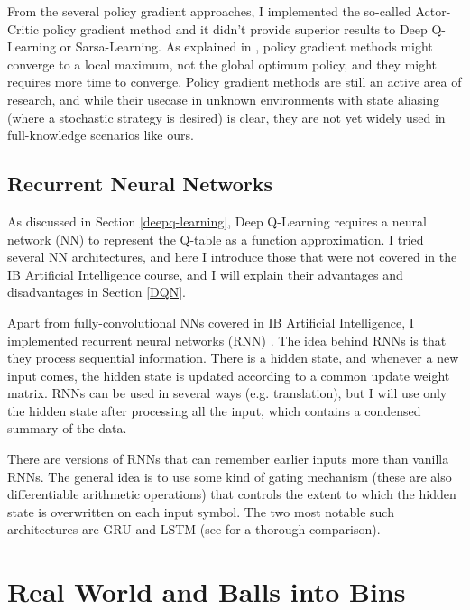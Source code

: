 From the several policy gradient approaches, I implemented the so-called Actor-Critic policy gradient method and it didn't provide superior results to Deep Q-Learning or Sarsa-Learning. As explained in \cite{bhandari2019policygradientconvergence}, policy gradient methods might converge to a local maximum, not the global optimum policy, and they might requires more time to converge. Policy gradient methods are still an active area of research, and while their usecase in unknown environments with state aliasing (where a stochastic strategy is desired) is clear, they are not yet widely used in full-knowledge scenarios like ours.


\subsection{Recurrent Neural Networks}


As discussed in Section \ref{deepq-learning}, Deep Q-Learning requires a neural network (NN) to represent the Q-table as a function approximation. I tried several NN architectures, and here I introduce those that were not covered in the IB Artificial Intelligence course, and I will explain their advantages and disadvantages in Section \ref{DQN}. 

Apart from fully-convolutional NNs covered in IB Artificial Intelligence, I implemented recurrent neural networks (RNN) \cite{hopfield1982RNNoriginal}. The idea behind RNNs is that they process sequential information. There is a hidden state, and whenever a new input comes, the hidden state is updated according to a common update weight matrix. RNNs can be used in several ways (e.g. translation), but I will use only the hidden state after processing all the input, which contains a condensed summary of the data.



There are versions of RNNs that can remember earlier inputs more than vanilla RNNs. The general idea is to use some kind of gating mechanism (these are also differentiable arithmetic operations) that controls the extent to which the hidden state is overwritten on each input symbol. The two most notable such architectures are GRU and LSTM (see \cite{shewalkar2019rnngrulstm} for a thorough comparison).


\section{Real World and Balls into Bins} \label{alternative}

